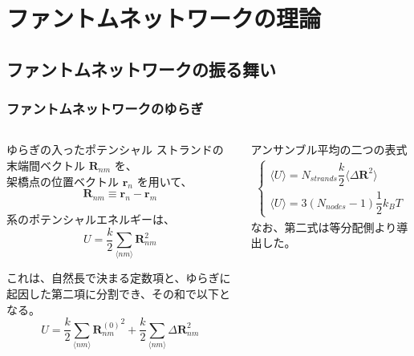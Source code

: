 \documentclass[11pt, dvipdfmx]{beamer}
\begin{document}
\section{ファントムネットワークの理論}
\subsection{ファントムネットワークの振る舞い}
\begin{frame}
\frametitle{ファントムネットワークのゆらぎ}

\begin{columns}[totalwidth=1\textwidth]
\scriptsize
\begin{block}{ゆらぎの入ったポテンシャル}
ストランドの末端間ベクトル $\bm{R}_{nm}$ を、\\架橋点の位置ベクトル $\bm{r}_n$ を用いて、
\vspace{-3mm}
\begin{equation*}
\bm{R}_{nm} \equiv \bm{r}_n-\bm{r}_m
\end{equation*}

系のポテンシャルエネルギーは、
\vspace{-3mm}
\begin{equation*}
U=\dfrac{k}{2} \sum_{\langle nm \rangle} \bm{R}_{nm}^2
\end{equation*}

これは、自然長で決まる定数項と、ゆらぎに起因した第二項に分割でき、その和で以下となる。
\vspace{-3mm}
\begin{equation*}
U=\dfrac{k}{2} \sum_{\langle nm \rangle} {\bm{R}_{nm}^{(0)}}^2 + \dfrac{k}{2} \sum_{\langle nm \rangle} \Delta \bm{R}_{nm}^2
\end{equation*}
\end{block}

\scriptsize
\begin{block}{アンサンブル平均の二つの表式}
\vspace{-5mm}
\begin{align*}
 \begin{cases}
	\langle U \rangle = N_{strands} \dfrac{k}{2} \langle \Delta \bm{R}^2 \rangle \\
	\langle U \rangle = 3(N_{nodes}-1) \dfrac{1}{2} k_B T
 \end{cases}
\end{align*}
なお、第二式は等分配側より導出した。
\end{block}


\end{columns}
\end{frame}
\end{document}
